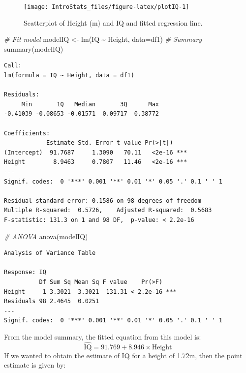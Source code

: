 \documentclass[
  oneside]{krantz}
\newenvironment{Shaded}{\begin{snugshade}}{\end{snugshade}}
\newcommand{\AttributeTok}[1]{\textcolor[rgb]{0.77,0.63,0.00}{#1}}
\newcommand{\CommentTok}[1]{\textcolor[rgb]{0.56,0.35,0.01}{\textit{#1}}}
\newcommand{\FunctionTok}[1]{\textcolor[rgb]{0.00,0.00,0.00}{#1}}
\newcommand{\NormalTok}[1]{#1}
\newcommand{\OtherTok}[1]{\textcolor[rgb]{0.56,0.35,0.01}{#1}}
\newcommand{\SpecialCharTok}[1]{\textcolor[rgb]{0.00,0.00,0.00}{#1}}
\begin{document}
\begin{figure}

{\centering \texttt{[image: IntroStats\_files/figure-latex/plotIQ-1]} 

}

\caption{Scatterplot of Height (m) and IQ and fitted regression line.}\label{fig:plotIQ}
\end{figure}

\begin{Shaded}
\begin{Highlighting}[]
\CommentTok{\# Fit model}
\NormalTok{modelIQ }\OtherTok{\textless{}{-}} \FunctionTok{lm}\NormalTok{(IQ }\SpecialCharTok{\textasciitilde{}}\NormalTok{ Height, }\AttributeTok{data=}\NormalTok{df1) }
\CommentTok{\# Summary}
\FunctionTok{summary}\NormalTok{(modelIQ)}
\end{Highlighting}
\end{Shaded}

\begin{verbatim}
Call:
lm(formula = IQ ~ Height, data = df1)

Residuals:
     Min       1Q   Median       3Q      Max 
-0.41039 -0.08653 -0.01571  0.09717  0.38772 

Coefficients:
            Estimate Std. Error t value Pr(>|t|)    
(Intercept)  91.7687     1.3090   70.11   <2e-16 ***
Height        8.9463     0.7807   11.46   <2e-16 ***
---
Signif. codes:  0 '***' 0.001 '**' 0.01 '*' 0.05 '.' 0.1 ' ' 1

Residual standard error: 0.1586 on 98 degrees of freedom
Multiple R-squared:  0.5726,    Adjusted R-squared:  0.5683 
F-statistic: 131.3 on 1 and 98 DF,  p-value: < 2.2e-16
\end{verbatim}

\begin{Shaded}
\begin{Highlighting}[]
\CommentTok{\# ANOVA }
\FunctionTok{anova}\NormalTok{(modelIQ)}
\end{Highlighting}
\end{Shaded}

\begin{verbatim}
Analysis of Variance Table

Response: IQ
          Df Sum Sq Mean Sq F value    Pr(>F)    
Height     1 3.3021  3.3021  131.31 < 2.2e-16 ***
Residuals 98 2.4645  0.0251                      
---
Signif. codes:  0 '***' 0.001 '**' 0.01 '*' 0.05 '.' 0.1 ' ' 1
\end{verbatim}

From the model summary, the fitted equation from this model is:
\[\hat {\textrm{IQ}} = 91.769+8.946 \times \textrm{Height}\]
If we wanted to obtain the estimate of IQ for a height of 1.72m, then the point estimate is given by:
\end{document}
